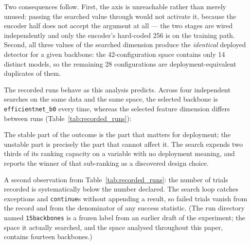 Two consequences follow. First, the axis is unreachable rather than merely
unused: passing the searched value through would not activate it, because the
encoder half does not accept the argument at all --- the two stages are wired
independently and only the encoder's hard-coded 256 is on the training path.
Second, all three values of the searched dimension produce the \emph{identical}
deployed detector for a given backbone: the 42-configuration space contains only
14 distinct models, so the remaining 28 configurations are
deployment-equivalent duplicates of them.

The recorded runs behave as this analysis predicts. Across four independent
searches on the same data and the same space, the selected backbone is
\texttt{efficientnet\_b0} every time, whereas the selected feature dimension
differs between runs (Table~\ref{tab:recorded_runs}):
%
\begin{table}[t]
\centering
\caption{The four recorded searches: trials declared and recorded, and the
configuration the search returned. The backbone is the same in all four runs
while the feature dimension varies, which is what an unreachable dimension
predicts (Section~\ref{subsec:inert}).}
\label{tab:recorded_runs}
\end{table}
%
The stable part of the outcome is the part that matters for deployment; the
unstable part is precisely the part that cannot affect it. The search expends
two thirds of its ranking capacity on a variable with no deployment meaning, and
reports the winner of that sub-ranking as a discovered design choice.

A second observation from Table~\ref{tab:recorded_runs}: the number of trials recorded is
systematically below the number declared. The search loop catches exceptions and
\texttt{continue}s without appending a result, so failed trials vanish from the
record and from the denominator of any success statistic. (The run directory named
\texttt{15backbones} is a frozen label from an earlier draft of the experiment; the
space it actually searched, and the space analysed throughout this paper, contains
fourteen backbones.)

